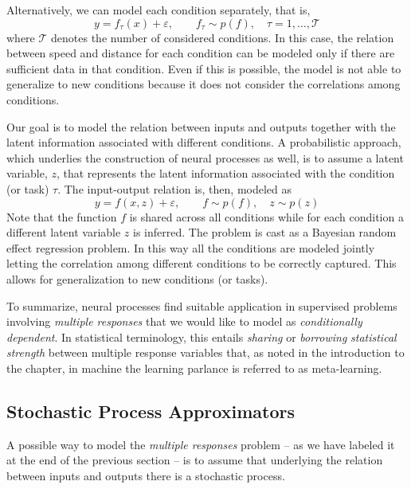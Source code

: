Alternatively, we can model each condition separately, that is, 
\begin{equation*}
    y = f_\tau(x) + \varepsilon, \qquad f_\tau\sim p(f), \quad \tau = 1,\dots,\mathcal{T}
\end{equation*}
where $\mathcal{T}$ denotes the number of considered conditions. In this case, the relation between speed and distance for each condition can be modeled only if there are sufficient data in that condition. Even if this is possible, the model is not able to generalize to new conditions because it does not consider the correlations among conditions.  

Our goal is to model the relation between inputs and outputs together with the latent information associated with different conditions. A probabilistic approach, which underlies the construction of neural processes as well, is to assume a latent variable, $z$, that represents the latent information associated with the condition (or task) $\tau$. The input-output relation is, then, modeled as 
\begin{equation}\label{eq:regz}
    y = f(x, z) + \varepsilon, \qquad f \sim p(f), \quad z \sim p(z)
\end{equation}
Note that the function $f$ is shared across all conditions while for each condition a different latent variable $z$ is inferred. The problem is cast as a Bayesian random effect regression problem. In this way all the conditions are modeled jointly letting the correlation among different conditions to be correctly captured. This allows for generalization to new conditions (or tasks). 

To summarize, neural processes find suitable application in supervised problems involving \textit{multiple responses} that we would like to model as \textit{conditionally dependent}. In statistical terminology, this entails \textit{sharing} or \textit{borrowing} \textit{statistical strength} between multiple response variables that, as noted in the introduction to the chapter, in machine the learning parlance is referred to as meta-learning.  



\subsection{Stochastic Process Approximators}
A possible way to model the \textit{multiple responses} problem -- as we have labeled it at the end of the previous section -- is to assume that underlying the relation between inputs and outputs there is a stochastic process.

